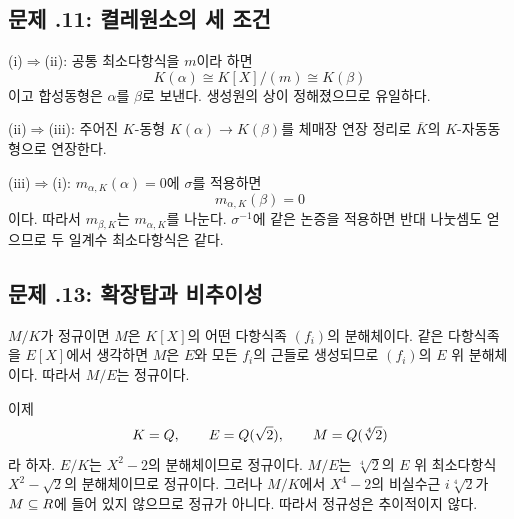 \subsection*{문제 \thechapter.11: 켤레원소의 세 조건}

\begin{solution}
(i)$\Rightarrow$(ii): 공통 최소다항식을 $m$이라 하면
\[
  K(\alpha)\cong K[X]/(m)\cong K(\beta)
\]
이고 합성동형은 $\alpha$를 $\beta$로 보낸다. 생성원의 상이 정해졌으므로 유일하다.

(ii)$\Rightarrow$(iii): 주어진 $K$-동형 $K(\alpha)\to K(\beta)$를 체매장 연장 정리로 $\overline K$의 $K$-자동동형으로 연장한다.

(iii)$\Rightarrow$(i): $m_{\alpha,K}(\alpha)=0$에 $\sigma$를 적용하면
\[
  m_{\alpha,K}(\beta)=0
\]
이다. 따라서 $m_{\beta,K}$는 $m_{\alpha,K}$를 나눈다. $\sigma^{-1}$에 같은 논증을 적용하면 반대 나눗셈도 얻으므로 두 일계수 최소다항식은 같다.
\end{solution}

\subsection*{문제 \thechapter.13: 확장탑과 비추이성}

\begin{solution}
$M/K$가 정규이면 $M$은 $K[X]$의 어떤 다항식족 $(f_i)$의 분해체이다. 같은 다항식족을 $E[X]$에서 생각하면 $M$은 $E$와 모든 $f_i$의 근들로 생성되므로 $(f_i)$의 $E$ 위 분해체이다. 따라서 $M/E$는 정규이다.

이제
\[
  K=Q,\qquad E=Q(\sqrt2),\qquad M=Q(\sqrt[4]{2})
\]
라 하자. $E/K$는 $X^2-2$의 분해체이므로 정규이다. $M/E$는 $\sqrt[4]{2}$의 $E$ 위 최소다항식 $X^2-\sqrt2$의 분해체이므로 정규이다. 그러나 $M/K$에서 $X^4-2$의 비실수근 $i\sqrt[4]{2}$가 $M\subseteq R$에 들어 있지 않으므로 정규가 아니다. 따라서 정규성은 추이적이지 않다.
\end{solution}
